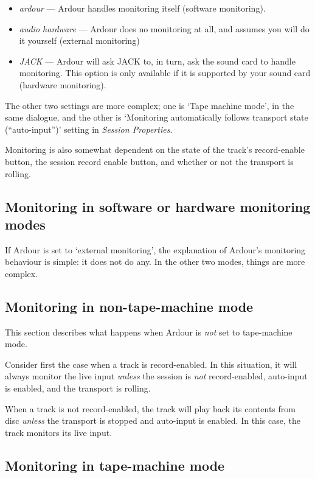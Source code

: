 \documentclass[10pt,a4paper]{book}
\begin{document}
\begin{itemize}
\item \emph{ardour} --- Ardour handles monitoring itself (software monitoring).
\item \emph{audio hardware} --- Ardour does no monitoring at all, and
  assumes you will do it yourself (external monitoring)
\item \emph{JACK} --- Ardour will ask JACK to, in turn, ask the sound
  card to handle monitoring.  This option is only available if it is
  supported by your sound card (hardware monitoring).
\end{itemize}

The other two settings are more complex; one is `Tape machine mode',
in the same dialogue, and the other is `Monitoring automatically
follows transport state (``auto-input'')' setting in \emph{Session
  Properties}.

Monitoring is also somewhat dependent on the state of the track's
record-enable button, the session record enable button, and whether or
not the transport is rolling.


\subsection{Monitoring in software or hardware monitoring modes}

If Ardour is set to `external monitoring', the explanation of Ardour's
monitoring behaviour is simple: it does not do any.  In the other two
modes, things are more complex.


\subsection{Monitoring in non-tape-machine mode}

This section describes what happens when Ardour is \emph{not} set to
tape-machine mode.

Consider first the case when a track is record-enabled.  In this
situation, it will always monitor the live input \emph{unless} the
session is \emph{not} record-enabled, auto-input is enabled, and the
transport is rolling.  

When a track is not record-enabled, the track will play back its
contents from disc \emph{unless} the transport is stopped and
auto-input is enabled.  In this case, the track monitors its live
input.


\subsection{Monitoring in tape-machine mode}
\end{document}
